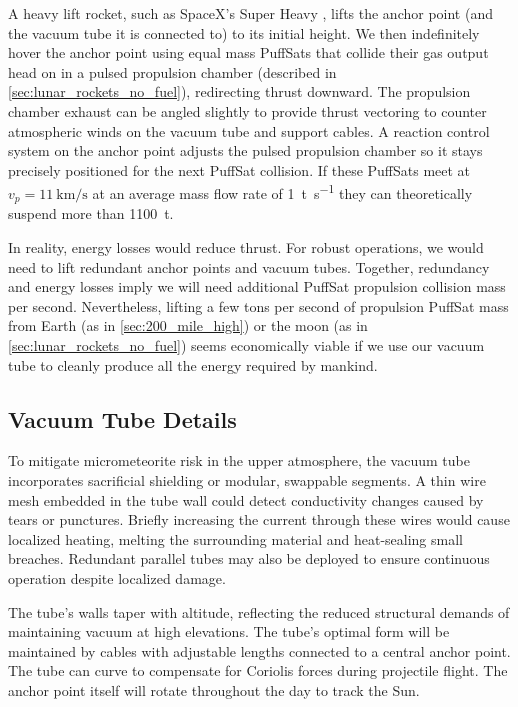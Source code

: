 \documentclass{article}
\begin{document}
A heavy lift rocket, such as SpaceX's Super Heavy \cite{spacex_super_heavy}, lifts the anchor point (and the vacuum tube it is connected to) to its initial height.  We then indefinitely hover the anchor point using equal mass PuffSats that collide their gas output head on in a pulsed propulsion chamber (described in \autoref{sec:lunar_rockets_no_fuel}), redirecting thrust downward. The propulsion chamber exhaust can be angled slightly to provide thrust vectoring to counter atmospheric winds on the vacuum tube and support cables.  A reaction control system on the anchor point adjusts the pulsed propulsion chamber so it stays precisely positioned for the next PuffSat collision.  If these PuffSats meet at $v_p=\SI{11}{\kilo\meter\per\second}$ at an average mass flow rate of \SI{1}{\tonne\per\second} they can theoretically suspend more than \SI{1100}{\tonne}.   

In reality, energy losses would reduce thrust.   For robust operations, we would need to lift redundant anchor points and vacuum tubes.  Together, redundancy and energy losses imply we will need additional PuffSat propulsion collision mass per second.  Nevertheless, lifting a few tons per second of propulsion PuffSat mass from Earth (as in \autoref{sec:200_mile_high}) or the moon (as in \autoref{sec:lunar_rockets_no_fuel}) seems economically viable if we use our vacuum tube to cleanly produce all the energy required by mankind. 

\subsection{Vacuum Tube Details}
To mitigate micrometeorite risk in the upper atmosphere, the vacuum tube incorporates sacrificial shielding or modular, swappable segments. A thin wire mesh embedded in the tube wall could detect conductivity changes caused by tears or punctures. Briefly increasing the current through these wires would cause localized heating, melting the surrounding material and heat-sealing small breaches. Redundant parallel tubes may also be deployed to ensure continuous operation despite localized damage. 

The tube’s walls taper with altitude, reflecting the reduced structural demands of maintaining vacuum at high elevations.  The tube's optimal form will be maintained by cables with adjustable lengths connected to a central anchor point. The tube can curve to compensate for Coriolis forces during projectile flight. The anchor point itself will rotate throughout the day to track the Sun.
\end{document}
